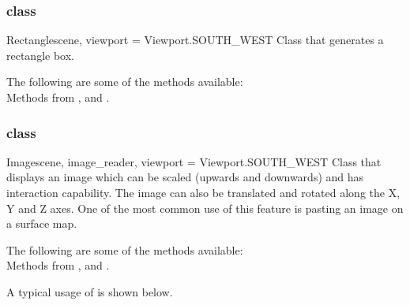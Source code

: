 \subsubsection{\Rectangle class}

\begin{classdesc}{Rectangle}{scene, viewport = Viewport.SOUTH_WEST}
Class that generates a rectangle box.
\end{classdesc}

The following are some of the methods available:\\
Methods from \ActorThreeD, \CubeSource and \DataSetMapper.

\subsubsection{\Image class}

\begin{classdesc}{Image}{scene, image_reader, viewport = Viewport.SOUTH_WEST}
Class that displays an image which can be scaled (upwards and downwards) and
has interaction capability. The image can also be translated and rotated along 
the X, Y and Z axes. One of the most common use of this feature is pasting an 
image on a surface map.
\end{classdesc}

The following are some of the methods available:\\
Methods from \ActorThreeD, \PlaneSource and \Transform.

A typical usage of \Image is shown below.

